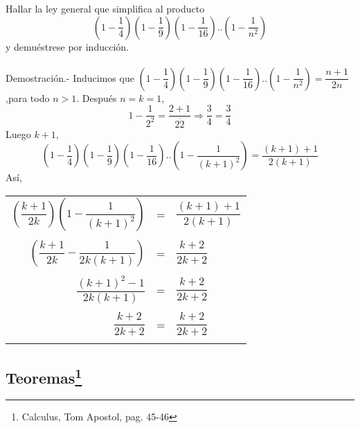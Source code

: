 \begin{ej}
Hallar la ley general que simplifica al producto $$\left( 1-\dfrac{1}{4} \right)\left( 1-\dfrac{1}{9} \right)\left( 1- \dfrac{1}{16} \right)..\left( 1- \dfrac{1}{n^2} \right)$$ y demuéstrese por inducción.\\\\
Demostración.- \; Inducimos que $\left( 1-\dfrac{1}{4} \right)\left( 1-\dfrac{1}{9} \right)\left( 1- \dfrac{1}{16} \right)..\left( 1- \dfrac{1}{n^2} \right)=\dfrac{n+1}{2n}$,para todo $n>1$. Después $n=k=1$, $$1-\dfrac{1}{2^2}=\dfrac{2+1}{2\dot 2} \Rightarrow \dfrac{3}{4}=\dfrac{3}{4}$$ 
Luego $k+1$, $$\left( 1-\dfrac{1}{4} \right)\left( 1-\dfrac{1}{9} \right)\left( 1- \dfrac{1}{16} \right)..\left( 1- \dfrac{1}{(k+1)^2} \right)=\dfrac{(k+1)+1}{2(k+1)}$$
Así,
\begin{center}
\begin{tabular}{r c l}
$\left( \dfrac{k+1}{2k}\right) \left( 1- \dfrac{1}{(k+1)^2} \right)$&=&$\dfrac{(k+1)+1}{2(k+1)}$\\\\
$\left( \dfrac{k+1}{2k} - \dfrac{1}{2k(k+1)} \right)$&=&$\dfrac{k+2}{2k+2}$\\\\
$\dfrac{(k+1)^2-1}{2k(k+1)}$&=&$\dfrac{k+2}{2k+2}$\\\\
$\dfrac{k+2}{2k+2}$&=&$\dfrac{k+2}{2k+2}$\\\\
\end{tabular}
\end{center}
\end{ej}





\subsection[Teoremas]{Teoremas\footnote{Calculus, Tom Apostol, pag. 45-46}}

